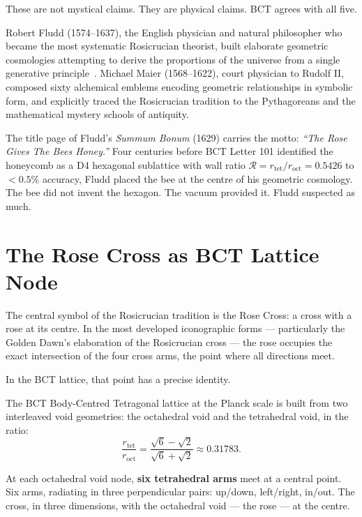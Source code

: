 \documentclass[12pt,twocolumn]{article}
\begin{document}
These are not mystical claims. They are physical claims. BCT
agrees with all five.

Robert Fludd (1574--1637), the English physician and natural
philosopher who became the most systematic Rosicrucian
theorist, built elaborate geometric cosmologies attempting to
derive the proportions of the universe from a single generative
principle~\cite{Fludd1629}. Michael Maier (1568--1622), court
physician to Rudolf II, composed sixty alchemical emblems
encoding geometric relationships in symbolic form, and
explicitly traced the Rosicrucian tradition to the
Pythagoreans and the mathematical mystery schools of antiquity.

The title page of Fludd's \textit{Summum Bonum} (1629) carries
the motto: \textit{``The Rose Gives The Bees Honey.''}
Four centuries before BCT Letter 101 identified the honeycomb
as a D4 hexagonal sublattice with wall ratio $\mathcal{R} =
r_{\mathrm{tet}}/r_{\mathrm{oct}} = 0.5426$ to $<0.5\%$
accuracy, Fludd placed the bee at the centre of his geometric
cosmology. The bee did not invent the hexagon. The vacuum
provided it. Fludd suspected as much.

\section{The Rose Cross as BCT Lattice Node}

The central symbol of the Rosicrucian tradition is the Rose
Cross: a cross with a rose at its centre. In the most
developed iconographic forms --- particularly the Golden
Dawn's elaboration of the Rosicrucian cross --- the rose
occupies the exact intersection of the four cross arms, the
point where all directions meet.

In the BCT lattice, that point has a precise identity.

The BCT Body-Centred Tetragonal lattice at the Planck scale
is built from two interleaved void geometries: the octahedral
void and the tetrahedral void, in the ratio:
\begin{equation}
  \frac{r_{\mathrm{tet}}}{r_{\mathrm{oct}}}
  = \frac{\sqrt{6}-\sqrt{2}}{\sqrt{6}+\sqrt{2}}
  \approx 0.31783.
\end{equation}

At each octahedral void node, \textbf{six tetrahedral arms}
meet at a central point. Six arms, radiating in three
perpendicular pairs: up/down, left/right, in/out. The cross,
in three dimensions, with the octahedral void --- the rose ---
at the centre.
\end{document}
